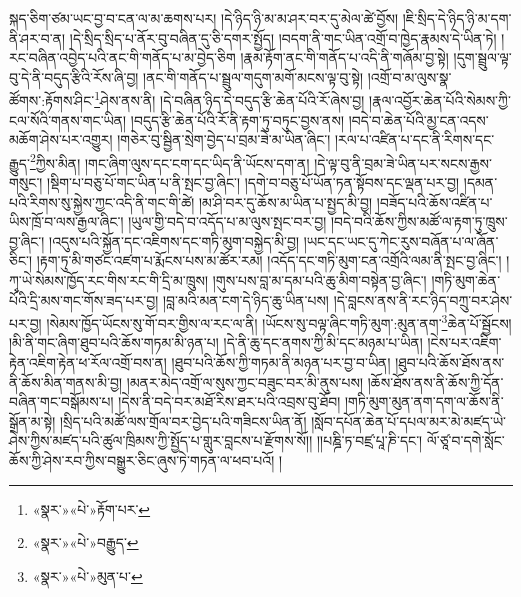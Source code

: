 སྐད་ཅིག་ཙམ་ཡང་བྱ་བ་ངན་ལ་མ་ཆགས་པར། །དེ་ཉིད་ཉི་མ་མ་ཤར་བར་དུ་མེལ་ཚེ་བྱོས། །ཇི་སྲིད་དེ་ཉིད་ཉི་མ་དག་ནི་ཤར་བ་ན། །དེ་སྲིད་སྲིད་པ་ནོར་བུ་བཞིན་དུ་ཅི་དགར་སྤྱོད། །བདག་ནི་གང་ཡིན་འགྲོ་བ་ཁྱེད་རྣམས་དེ་ཡིན་ཏེ། །རང་བཞིན་འབྱེད་པའི་ནང་གི་གནོད་པ་མ་བྱེད་ཅིག །རྣམ་རྟོག་ནང་གི་གནོད་པ་འདི་ནི་གཞོམ་བྱ་སྟེ། །དུག་སྦྲུལ་ལྟ་བུ་དེ་ནི་བདུད་རྩིའི་རོས་ཞི་བྱ། །ནང་གི་གནོད་པ་སྦྲུལ་གདུག་མགོ་མངས་ལྟ་བུ་སྟེ། །འགྲོ་བ་མ་ལུས་སྣ་ཚོགས་:རྟོགས་ཤིང་\footnote{«སྣར་»«པེ་»རྟོག་པར་}ཤེས་ནས་ནི། །དེ་བཞིན་ཉིད་དེ་བདུད་རྩི་ཆེན་པོའི་རོ་ཞེས་བྱ། །རྣལ་འབྱོར་ཆེན་པོའི་སེམས་ཀྱི་ངལ་སོའི་གནས་གང་ཡིན། །བདུད་རྩི་ཆེན་པོའི་རོ་ནི་རྟག་ཏུ་བཏུང་བྱས་ནས། །བདེ་བ་ཆེན་པོའི་མྱ་ངན་འདས་མཆོག་ཤེས་པར་འགྱུར། །གཅེར་བུ་སྦྱིན་སྲེག་བྱེད་པ་བྲམ་ཟེ་མ་ཡིན་ཞིང་། །རལ་པ་འཛིན་པ་དང་ནི་རིགས་དང་རྒྱུད་\footnote{«སྣར་»«པེ་»བརྒྱུད་}ཀྱིས་མིན། །གང་ཞིག་ལུས་དང་ངག་དང་ཡིད་ནི་ཡོངས་དག་ན། །དེ་ལྟ་བུ་ནི་བྲམ་ཟེ་ཡིན་པར་སངས་རྒྱས་གསུང་། །སྡིག་པ་བཅུ་པོ་གང་ཡིན་པ་ནི་སྤང་བྱ་ཞིང་། །དགེ་བ་བཅུ་པོ་ཡོན་ཏན་སྟོབས་དང་ལྡན་པར་བྱ། །དམན་པའི་རིགས་སུ་སྐྱེས་ཀྱང་འདི་ནི་གང་གི་ཚེ། །མ་ཤི་བར་དུ་ཆོས་མ་ཡིན་པ་སྤྱད་མི་བྱ། །བཟོད་པའི་ཆོས་འཛིན་པ་ཡིས་ཁྲོ་བ་ལས་རྒྱལ་ཞིང་། །ཡུལ་གྱི་བདེ་བ་འདོད་པ་མ་ལུས་སྤང་བར་བྱ། །བདེ་བའི་ཆོས་ཀྱིས་མཚོ་ལ་རྟག་ཏུ་ཁྲུས་བྱ་ཞིང་། །འདུས་པའི་སྐྱོན་དང་འཇིགས་དང་གཏི་མུག་བསྐྱེད་མི་བྱ། །ཡང་དང་ཡང་དུ་ཀེང་རུས་བཞོན་པ་ལ་ཞོན་ཅིང་། །རྟག་ཏུ་མི་གཙང་འཛག་པ་རྨོངས་པས་མ་ཚོར་རམ། །འདོད་དང་གཏི་མུག་ངན་འགྲོའི་ལམ་ནི་སྤང་བྱ་ཞིང་། །ཀྭ་ཡེ་སེམས་ཁྱོད་རང་གིས་རང་གི་དྲི་མ་ཁྲུས། །གུས་པས་བླ་མ་དམ་པའི་ཆུ་མིག་བསྟེན་བྱ་ཞིང་། །གཏི་མུག་ཆེན་པོའི་དྲི་མས་གང་གོས་ཟད་པར་བྱ། །བླ་མའི་མན་ངག་དེ་ཉིད་ཆུ་ཡིན་པས། །དེ་བླངས་ནས་ནི་རང་ཉིད་བཀྲུ་བར་ཤེས་པར་བྱ། །སེམས་ཁྱོད་ཡོངས་སུ་གོ་བར་གྱིས་ལ་རང་ལ་ནི། །ཡོངས་སུ་བལྟ་ཞིང་གཏི་མུག་:མུན་ནག་\footnote{«སྣར་»«པེ་»མུན་པ་}ཆེན་པོ་སྦྱོངས། །མི་ནི་གང་ཞིག་ཐུབ་པའི་ཆོས་གཏམ་མི་ཉན་པ། །དེ་ནི་ཆུ་དང་ནགས་ཀྱི་མི་དང་མཉམ་པ་ཡིན། །ངེས་པར་འཇིག་རྟེན་འཇིག་རྟེན་ཕ་རོལ་འགྲོ་བས་ན། །ཐུབ་པའི་ཆོས་ཀྱི་གཏམ་ནི་མཉན་པར་བྱ་བ་ཡིན། །ཐུབ་པའི་ཆོས་ཐོས་ནས་ནི་ཆོས་མིན་གནས་མི་བྱ། །མནར་མེད་འགྲོ་ལ་སུས་ཀྱང་བཟུང་བར་མི་ནུས་པས། །ཆོས་ཐོས་ནས་ནི་ཆོས་ཀྱི་དོན་བཞིན་གང་བསྒོམས་པ། །དེས་ནི་བདེ་བར་མཐོ་རིས་ཐར་པའི་འབྲས་བུ་ཐོབ། །གཏི་མུག་མུན་ནག་དག་ལ་ཆོས་ནི་སྒྲོན་མ་སྟེ། །སྲིད་པའི་མཚོ་ལས་གྲོལ་བར་བྱེད་པའི་གཟིངས་ཡིན་ནོ། །སློབ་དཔོན་ཆེན་པོ་དཔལ་མར་མེ་མཛད་ཡེ་ཤེས་ཀྱིས་མཛད་པའི་ཚུལ་ཁྲིམས་ཀྱི་སྤྱོད་པ་གླུར་བླངས་པ་རྫོགས་སོ།། །།པཎྜི་ཏ་བཛྲ་པཱ་ཎི་དང་། ལོ་ཙཱ་བ་དགེ་སློང་ཆོས་ཀྱི་ཤེས་རབ་ཀྱིས་བསྒྱུར་ཅིང་ཞུས་ཏེ་གཏན་ལ་ཕབ་པའོ། ། 